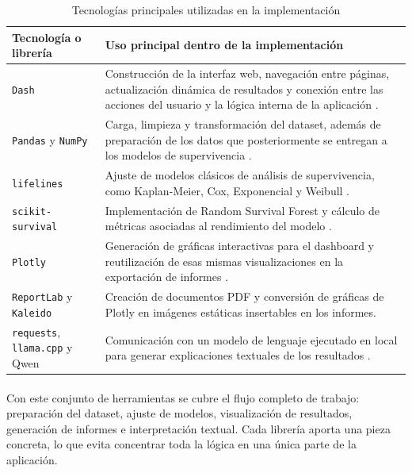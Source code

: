 \begin{table}[H]
\centering
\small
\begin{tabularx}{\textwidth}{|p{}|X|}
\hline
\textbf{Tecnología o librería} & \textbf{Uso principal dentro de la implementación} \\ \hline
\texttt{Dash} & Construcción de la interfaz web, navegación entre páginas, actualización dinámica de resultados y conexión entre las acciones del usuario y la lógica interna de la aplicación \cite{dash_tutorial}. \\ \hline
\texttt{Pandas} y \texttt{NumPy} & Carga, limpieza y transformación del dataset, además de preparación de los datos que posteriormente se entregan a los modelos de supervivencia \cite{pandas_manual_alf,numpy_manual_alf}. \\ \hline
\texttt{lifelines} & Ajuste de modelos clásicos de análisis de supervivencia, como Kaplan-Meier, Cox, Exponencial y Weibull \cite{davidsonpilon2019lifelines}. \\ \hline
\texttt{scikit-survival} & Implementación de Random Survival Forest y cálculo de métricas asociadas al rendimiento del modelo \cite{polsterl2020scikit}. \\ \hline
\texttt{Plotly} & Generación de gráficas interactivas para el dashboard y reutilización de esas mismas visualizaciones en la exportación de informes \cite{plotly_python_intro}. \\ \hline
\texttt{ReportLab} y \texttt{Kaleido} & Creación de documentos PDF y conversión de gráficas de Plotly en imágenes estáticas insertables en los informes. \\ \hline
\texttt{requests}, \texttt{llama.cpp} y Qwen & Comunicación con un modelo de lenguaje ejecutado en local para generar explicaciones textuales de los resultados \cite{llamacpp_repo,llamacpp_server,qwen25_technical_report,qwen25_huggingface_gguf}. \\ \hline
\end{tabularx}
\caption{Tecnologías principales utilizadas en la implementación}
\label{tab:tecnologias_implementacion}
\normalsize
\end{table}

\paragraph*{}
Con este conjunto de herramientas se cubre el flujo completo de trabajo: preparación del dataset, ajuste de modelos, visualización de resultados, generación de informes e interpretación textual. Cada librería aporta una pieza concreta, lo que evita concentrar toda la lógica en una única parte de la aplicación.

